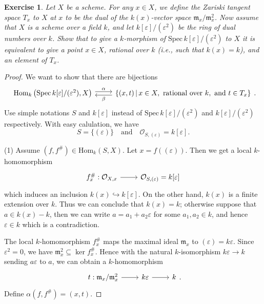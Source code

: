\documentclass{amsart}
\newtheorem{exe}{Exercise}[subsection]
\begin{document}
\begin{exe}
	Let $X$ be a scheme. For any $x\in X$, we define the \emph{Zariski tangent space} $T_x$ to $X$ at $x$ to be the dual of the $k(x)$-vector space $\mathfrak{m}_x/\mathfrak{m}_x^2$. Now assume that $X$ is a scheme over a field $k$, and let $k[\varepsilon]/(\varepsilon^2)$ be the ring of dual numbers over $k$. Show that to give a $k$-morphism of $\mathrm{Spec}\,k[\varepsilon]/(\varepsilon^2)$ to $X$ it is equivalent to give a point $x\in X$, \emph{rational over} $k$ (i.e., such that $k(x)=k$), and an element of $T_x$.
\end{exe}

\begin{proof}
	We want to show that there are bijections
	\begin{equation*}
		\begin{tikzcd}
			{\mathrm{Hom}_k\left(\mathrm{Spec}\,k[\varepsilon]/(\varepsilon^2),X\right)} \arrow[r, "\alpha", shift left] & {\{(x,t)\,|\,x\in X,\ \text{rational over }k ,\ \text{and }t\in T_x \}} \arrow[l, "\beta", shift left]
		\end{tikzcd}.
	\end{equation*}
	Use simple notations $S$ and $k[\varepsilon]$ instead of $\mathrm{Spec}\,k[\varepsilon]/(\varepsilon^2)$ and $k[\varepsilon]/(\varepsilon^2)$ respectively. With easy calulation, we have$$S=\{(\varepsilon)\}\quad\text{and}\quad\mathcal{O}_{S,(\varepsilon)}=k[\varepsilon].$$
	
	(1) Assume $(f,f^\#)\in\mathrm{Hom}_k(S,X)$. Let $x=f((\varepsilon))$. Then we get a local $k$-homomorphism
	\begin{equation*}
		\begin{tikzcd}
			{f^\#_x:\mathcal{O}_{X,x}} \arrow[r] & {\mathcal{O}_{S,(\varepsilon)}=k[\varepsilon]}
		\end{tikzcd}
	\end{equation*}
	which induces an inclusion $k(x)\hookrightarrow k[\varepsilon]$. On the other hand, $k(x)$ is a finite extension over $k$. Thus we can conclude that $k(x)=k$; otherwise suppose that $a\in k(x)-k$, then we can write $a=a_1+a_2\varepsilon$ for some $a_1,a_2\in k$, and hence $\varepsilon\in k$ which is a contradiction.
	
	The local $k$-homomorphism $f_x^\#$ maps the maximal ideal $\mathfrak{m}_x$ to $(\varepsilon)=k\varepsilon$. Since $\varepsilon^2=0$, we have $\mathfrak{m}_x^2\subseteq\ker f^\#_x$. Hence with the natural $k$-isomorphism $k\varepsilon\to k$ sending $a\varepsilon$ to $a$, we can obtain a $k$-homomorphism
	\begin{equation*}
		\begin{tikzcd}
			t:\mathfrak{m}_x/\mathfrak{m}_x^2 \arrow[r] & k\varepsilon \arrow[r] & k
		\end{tikzcd}.
	\end{equation*}
	Define $\alpha(f,f^\#)=(x,t)$.
	

\end{proof}
\end{document}
